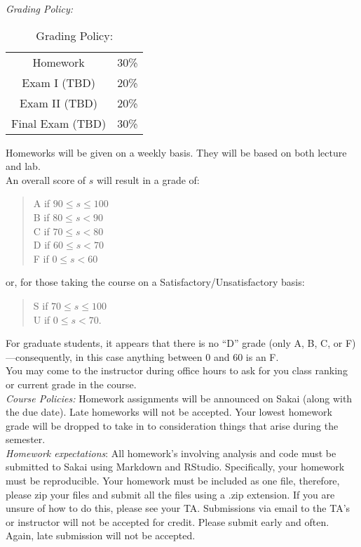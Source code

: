 \documentclass[11pt]{article}
\begin{document}
\emph{Grading Policy:} 

\begin{table}[ht]
\caption{Grading Policy:}
\begin{center}
\begin{tabular}{cc}
Homework &30\%\\
Exam I (TBD) &20\%\\
Exam  II (TBD) & 20\%\\
Final Exam  (TBD) & 30\%\\
\end{tabular}
\end{center}
\label{default}
\end{table}%

Homeworks will be given on a weekly basis. They will be based on both lecture and lab. \\

An overall score of $s$ will result in a grade of:
\begin{quote}
A if $90\leq s\leq 100$ \\
B if $80\leq s < 90$ \\
C if $70\leq s < 80$ \\
D if $60\leq s < 70$ \\
F if $0\leq s < 60$
\end{quote}
or, for those taking the course on a Satisfactory/Unsatisfactory basis:
\begin{quote}
S if $70\leq s\leq 100$ \\
U if $0\leq s < 70$.
\end{quote}
For graduate students, it appears that there is no ``D'' grade (only A, B, C, or F)---consequently, in this case anything between $0$ and $60$ is an F. \\

You may come to the instructor during office hours to ask for you class ranking or current grade in the course. \\

\emph{Course Policies:} 
Homework assignments will be announced on Sakai (along with the due date). Late homeworks will not be accepted. Your lowest homework grade will be dropped to take in to consideration things that arise during the semester. \\

\emph{Homework expectations}: All homework's involving analysis and code must be submitted to Sakai using Markdown and RStudio. Specifically, your homework must be reproducible. Your homework must be included as one file, therefore, please zip your files and submit all the files using a .zip extension. If you are unsure of how to do this, please see your TA. Submissions via email to the TA's or instructor will not be accepted for credit. Please submit early and often. Again, late submission will not be accepted. \\
\end{document}
